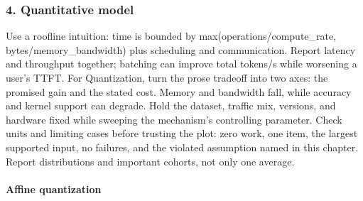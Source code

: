 \subsubsection*{4. Quantitative model}
Use a roofline intuition: time is bounded by max(operations/compute\_rate, bytes/memory\_bandwidth) plus scheduling and communication. Report latency and throughput together; batching can improve total tokens/s while worsening a user's TTFT.
For Quantization, turn the prose tradeoff into two axes: the promised gain and the stated cost. Memory and bandwidth fall, while accuracy and kernel support can degrade. Hold the dataset, traffic mix, versions, and hardware fixed while sweeping the mechanism's controlling parameter.
Check units and limiting cases before trusting the plot: zero work, one item, the largest supported input, no failures, and the violated assumption named in this chapter. Report distributions and important cohorts, not only one average.
\paragraph{Affine quantization}
